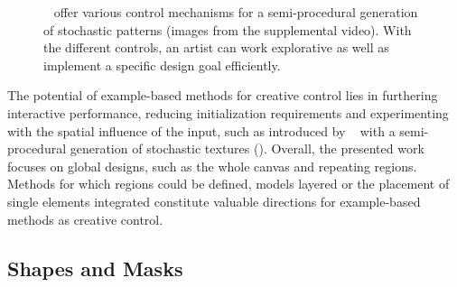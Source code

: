 \begin{figure}[H]
    \centering
    \caption{\label{fig:guehl_2020_stu}\citeauthor*{guehl_2020_stu}~\cite{guehl_2020_stu} offer various control mechanisms for a semi-procedural generation of stochastic patterns (images from the supplemental video). With the different controls, an artist can work explorative as well as implement a specific design goal efficiently. }
\end{figure}

The potential of example-based methods for creative control lies in furthering interactive performance, reducing initialization requirements and experimenting with the spatial influence of the input, such as introduced by \citeauthor*{guehl_2020_stu}~\cite{guehl_2020_stu} with a semi-procedural generation of stochastic textures (). Overall, the presented work focuses on global designs, such as the whole canvas and repeating regions. Methods for which regions could be defined, models layered or the placement of single elements integrated constitute valuable directions for example-based methods as creative control.



\subsection{Shapes and Masks}
\label{subsubsec:analysis_creative_means_shapes}

